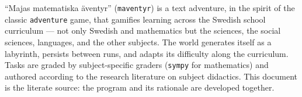 \enquote{Majas matematiska äventyr} (\texttt{maventyr}) is a text adventure,
in the spirit of the classic \texttt{adventure} game, that gamifies learning
across the Swedish school curriculum --- not only Swedish and mathematics but
the sciences, the social sciences, languages, and the other subjects.  The
world generates itself as a labyrinth, persists between runs, and adapts its
difficulty along the curriculum.  Tasks are graded by subject-specific graders
(\texttt{sympy} for mathematics) and authored according to the research
literature on subject didactics.  This document is the literate source: the
program and its rationale are developed together.
